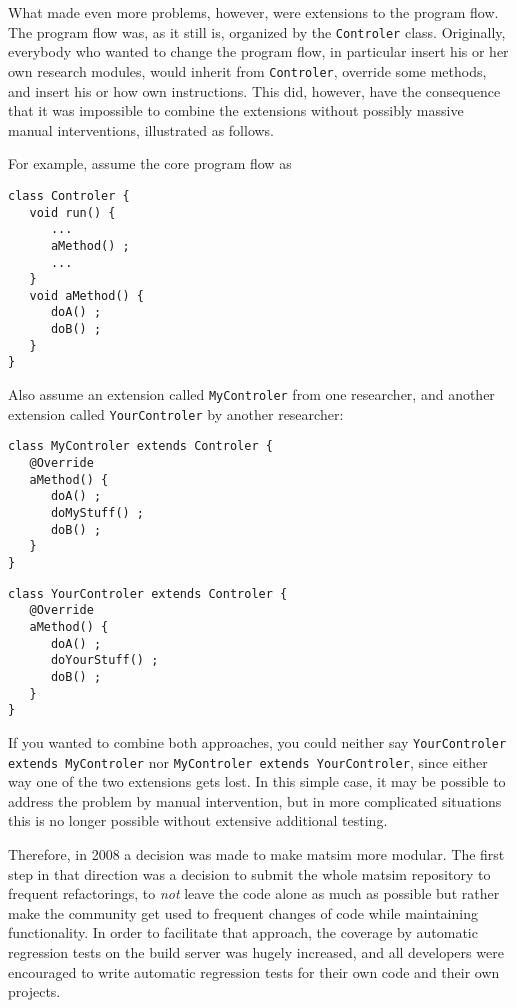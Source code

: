 What made even more problems, however, were extensions to the program flow.  The program flow was, as it still is, organized by the \lstinline$Controler$ class.  Originally, everybody who wanted to change the program flow, in particular insert his or her own research \glspl{module}, would inherit from \lstinline$Controler$, override some methods, and insert his or how own instructions.  This did, however, have the consequence that it was impossible to combine the \glspl{extension} without possibly massive manual interventions, illustrated as follows.

For example, assume the core program flow as
\begin{lstlisting}
class Controler {
   void run() {
      ...
      aMethod() ;
      ...
   }
   void aMethod() {
      doA() ;
      doB() ;
   }
}
\end{lstlisting}
Also assume an extension called \protect\lstinline$MyControler$
from one researcher, and another extension called \protect\lstinline$YourControler$ by another researcher:
\begin{lstlisting}
class MyControler extends Controler {
   @Override
   aMethod() {
      doA() ;
      doMyStuff() ;
      doB() ;
   }
}
\end{lstlisting}
\begin{lstlisting}
class YourControler extends Controler {
   @Override
   aMethod() {
      doA() ;
      doYourStuff() ;
      doB() ;
   }
}  
\end{lstlisting}
%
If you wanted to combine both approaches, you could neither say \protect\lstinline$YourControler extends MyControler$ nor \protect\lstinline$MyControler extends YourControler$, since either way one of the two extensions gets lost.  In this simple case, it may be possible to address the problem by manual intervention, but in more complicated situations this is no longer possible without extensive additional testing. %

Therefore, in 2008 a decision was made to make \gls{matsim} more modular.  The first step in that direction was a decision to submit the whole \gls{matsim} repository to frequent refactorings, \ie to \emph{not} leave the code alone as much as possible but rather make the community get used to frequent changes of code while maintaining functionality.  In order to facilitate that approach, the coverage by automatic regression tests on the build server was hugely increased, and all developers were encouraged to write automatic regression tests for their own code and their own projects. 

